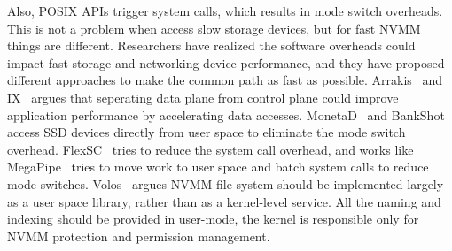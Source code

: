 Also, POSIX APIs trigger system calls, which results in mode switch overheads.
This is not a problem when access slow storage devices, but for fast NVMM things
are different.
Researchers have realized the software overheads could impact
fast storage and networking device performance,
and they have proposed different approaches to make the common path as fast
as possible.
Arrakis~\cite{Arrakis} and IX~\cite{IX} argues that seperating data plane
from control plane could improve application performance by accelerating
data accesses. MonetaD~\cite{monetad} and BankShot~\cite{BankShot} access
SSD devices directly from user space to eliminate the mode switch overhead.
FlexSC~\cite{FlexSC} tries to reduce the system call overhead,
and works like MegaPipe~\cite{MegaPipe} tries to move work to user space and
batch system calls to reduce mode switches. Volos~\cite{system-scm} argues
NVMM file system should be implemented largely as a user space library, rather
than as a kernel-level service. All the naming and indexing should be provided
in user-mode, the kernel is responsible only for NVMM protection and permission
management.

